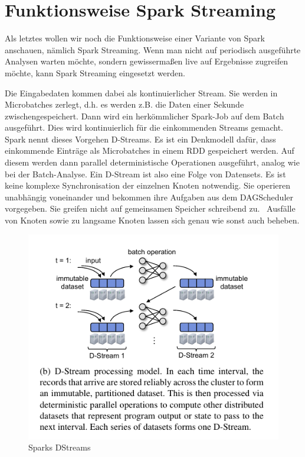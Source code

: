 \section[Funktionsweise Spark
Streaming]{\rmfamily Funktionsweise Spark
Streaming}
Als letztes wollen wir noch die Funktionsweise einer Variante von Spark
anschauen, nämlich Spark Streaming. Wenn man nicht auf periodisch
ausgeführte Analysen warten möchte, sondern gewissermaßen live auf
Ergebnisse zugreifen möchte, kann Spark Streaming eingesetzt werden.

Die Eingabedaten kommen dabei als kontinuierlicher Stream. Sie werden in
Microbatches zerlegt, d.h. es werden z.B. die Daten einer Sekunde
zwischengespeichert. Dann wird ein herkömmlicher Spark-Job auf dem
Batch ausgeführt. Dies wird kontinuierlich für die einkommenden Streams
gemacht. Spark nennt dieses Vorgehen D-Streams. Es ist ein Denkmodell
dafür, dass einkommende Einträge als Microbatches in einem RDD
gespeichert werden. Auf diesem werden dann parallel deterministische
Operationen ausgeführt, analog wie bei der Batch-Analyse. Ein D-Stream
ist also eine Folge von Datensets. Es ist keine komplexe
Synchronisation der einzelnen Knoten notwendig. Sie operieren
unabhängig voneinander und bekommen ihre Aufgaben aus dem DAGScheduler
vorgegeben. Sie greifen nicht auf gemeinsamen Speicher schreibend zu.
\ Ausfälle von Knoten sowie zu langsame Knoten lassen sich genau wie
sonst auch beheben. 

\begin{figure}
\centering
\includegraphics[width=\textwidth]{bilder/Seminartext-img4.png}
\caption{Sparks DStreams}
\end{figure}
